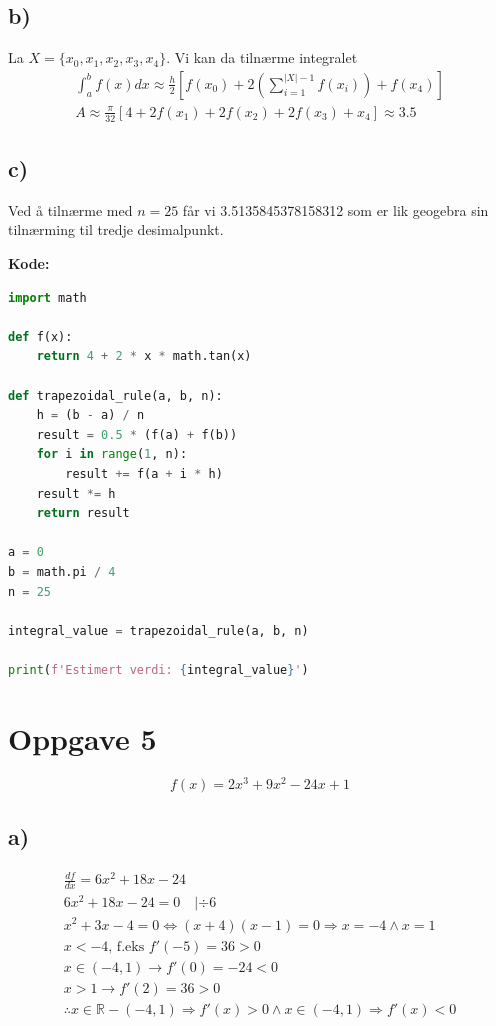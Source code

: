 \documentclass[12pt]{article}
\begin{document}
\subsection*{b)}
La \(X = \{x_0, x_1, x_2, x_3, x_4\}\). Vi kan da tilnærme integralet 
\begin{gather*}
  \displaystyle\int_{a}^{b}f(x)dx \approx 
  \frac{h}{2} [f(x_0) 
  + 2(\displaystyle\sum_{i = 1}^{|X| - 1} f(x_i)) +
  f(x_4) ] \\ 
  \boxed{A \approx \frac{\pi}{32}[4+2f(x_1)+2f(x_2)+2f(x_3)+x_4] \approx 3.5}
\end{gather*}

\break
\subsection*{c)}
Ved å tilnærme med \(n=25\) får vi 3.5135845378158312 som er lik geogebra sin 
tilnærming til tredje desimalpunkt.

\noindent
\textbf{Kode: }
\begin{lstlisting}[language=Python]
import math

def f(x):
    return 4 + 2 * x * math.tan(x)

def trapezoidal_rule(a, b, n):
    h = (b - a) / n
    result = 0.5 * (f(a) + f(b))  
    for i in range(1, n):
        result += f(a + i * h) 
    result *= h  
    return result

a = 0
b = math.pi / 4
n = 25

integral_value = trapezoidal_rule(a, b, n)

print(f'Estimert verdi: {integral_value}')
\end{lstlisting}

\break 
\section*{Oppgave 5}
\[f(x)=2x^3+9x^2-24x+1\]

\subsection*{a)}
\begin{gather*}
  \frac{df}{dx} = 6x^2+18x-24 \\ 
  6x^2 + 18x - 24 = 0 \quad | \div 6 \\ 
  x^2 + 3x - 4 = 0 \Leftrightarrow (x+4)(x-1) = 0 \Rightarrow x = -4 \land x = 1 \\ 
  x < -4 \text{, f.eks } f'(-5)=36 > 0 \\ 
  x \in (-4,1) \rightarrow f'(0)= -24 < 0 \\ 
  x > 1 \rightarrow f'(2) = 36 > 0 \\ 
  \therefore x \in \mathbb R - (-4,1) \Rightarrow f'(x) > 0 
  \land x \in (-4,1) \Rightarrow f'(x) < 0
\end{gather*}
\end{document}
